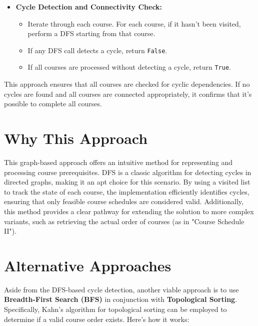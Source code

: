 \begin{itemize}
    \item \textbf{Cycle Detection and Connectivity Check:}
    \begin{itemize}
        \item Iterate through each course. For each course, if it hasn't been visited, perform a DFS starting from that course.
        \item If any DFS call detects a cycle, return \texttt{False}.
        \item If all courses are processed without detecting a cycle, return \texttt{True}.
    \end{itemize}
\end{itemize}

This approach ensures that all courses are checked for cyclic dependencies. If no cycles are found and all courses are connected appropriately, it confirms that it's possible to complete all courses.

\section*{Why This Approach}

This graph-based approach offers an intuitive method for representing and processing course prerequisites. DFS is a classic algorithm for detecting cycles in directed graphs, making it an apt choice for this scenario. By using a visited list to track the state of each course, the implementation efficiently identifies cycles, ensuring that only feasible course schedules are considered valid. Additionally, this method provides a clear pathway for extending the solution to more complex variants, such as retrieving the actual order of courses (as in "Course Schedule II").

\section*{Alternative Approaches}

Aside from the DFS-based cycle detection, another viable approach is to use \textbf{Breadth-First Search (BFS)} in conjunction with \textbf{Topological Sorting}. Specifically, Kahn's algorithm for topological sorting can be employed to determine if a valid course order exists. Here's how it works:

